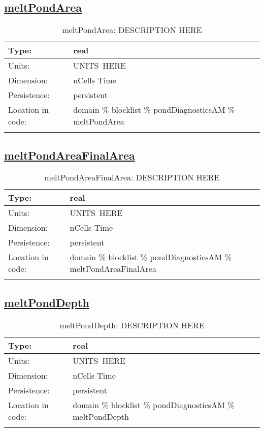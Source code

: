 \subsection[meltPondArea]{\hyperref[sec:var_tab_pondDiagnosticsAM]{meltPondArea}}
\label{subsec:var_sec_pondDiagnosticsAM_meltPondArea}
\begin{center}
\begin{longtable}{| p{2.0in} | p{4.0in} |}
        \hline 
        Type: & real \\
        \hline 
        Units: & \si{UNITS.HERE} \\
        \hline 
        Dimension: & nCells Time \\
        \hline 
        Persistence: & persistent \\
        \hline 
         Location in code: & domain \% blocklist \% pondDiagnosticsAM \% meltPondArea \\
         \hline 
    \caption{meltPondArea: DESCRIPTION HERE}
\end{longtable}
\end{center}
\subsection[meltPondAreaFinalArea]{\hyperref[sec:var_tab_pondDiagnosticsAM]{meltPondAreaFinalArea}}
\label{subsec:var_sec_pondDiagnosticsAM_meltPondAreaFinalArea}
\begin{center}
\begin{longtable}{| p{2.0in} | p{4.0in} |}
        \hline 
        Type: & real \\
        \hline 
        Units: & \si{UNITS.HERE} \\
        \hline 
        Dimension: & nCells Time \\
        \hline 
        Persistence: & persistent \\
        \hline 
         Location in code: & domain \% blocklist \% pondDiagnosticsAM \% meltPondAreaFinalArea \\
         \hline 
    \caption{meltPondAreaFinalArea: DESCRIPTION HERE}
\end{longtable}
\end{center}
\subsection[meltPondDepth]{\hyperref[sec:var_tab_pondDiagnosticsAM]{meltPondDepth}}
\label{subsec:var_sec_pondDiagnosticsAM_meltPondDepth}
\begin{center}
\begin{longtable}{| p{2.0in} | p{4.0in} |}
        \hline 
        Type: & real \\
        \hline 
        Units: & \si{UNITS.HERE} \\
        \hline 
        Dimension: & nCells Time \\
        \hline 
        Persistence: & persistent \\
        \hline 
         Location in code: & domain \% blocklist \% pondDiagnosticsAM \% meltPondDepth \\
         \hline 
    \caption{meltPondDepth: DESCRIPTION HERE}
\end{longtable}
\end{center}
